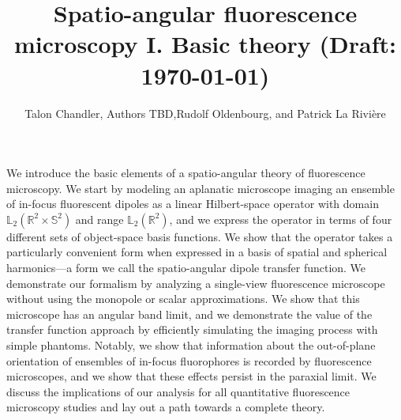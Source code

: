 \documentclass[]{osa-article}
\providecommand{\mbb}[1]{\mathbb{#1}}
\begin{document}
\title{Spatio-angular fluorescence microscopy I. Basic theory (Draft: \today)}

\author{Talon Chandler, Authors TBD,Rudolf Oldenbourg, and Patrick La Rivi\`ere }

\address{University of Chicago, Department of Radiology, Chicago, Illinois 60637, USA\\
Publications Department, The Optical Society, 2010 Massachusetts Avenue NW, Washington, DC 20036, USA\\
Currently with the Department of Electronic Journals, The Optical Society, 2010 Massachusetts Avenue NW, Washington, DC 20036, USA}




\begin{abstract*}
  We introduce the basic elements of a spatio-angular theory of fluorescence
  microscopy. We start by modeling an aplanatic microscope imaging an ensemble
  of in-focus fluorescent dipoles as a linear Hilbert-space operator with domain
  $\mbb{L}_2(\mbb{R}^2\times\mbb{S}^2)$ and range $\mbb{L}_2(\mbb{R}^2)$, and we
  express the operator in terms of four different sets of object-space basis
  functions. We show that the operator takes a particularly convenient form when
  expressed in a basis of spatial and spherical harmonics---a form we call the
  spatio-angular dipole transfer function. We demonstrate our formalism by
  analyzing a single-view fluorescence microscope without using the monopole or
  scalar approximations. We show that this microscope has an angular band limit,
  and we demonstrate the value of the transfer function approach by efficiently
  simulating the imaging process with simple phantoms. Notably, we show that
  information about the out-of-plane orientation of ensembles of in-focus
  fluorophores is recorded by fluorescence microscopes, and we show that these
  effects persist in the paraxial limit. We discuss the implications of our
  analysis for all quantitative fluorescence microscopy studies and lay out a
  path towards a complete theory.
\end{abstract*}
\end{document}
